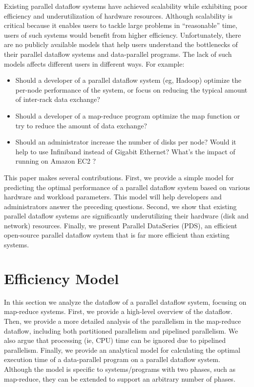 \documentclass{acm_proc_article-sp}
\begin{document}
Existing parallel dataflow systems have achieved scalability while exhibiting poor efficiency and underutilization of hardware resources. Although scalability is critical because it enables users to tackle large problems in ``reasonable'' time, users of such systems would benefit from higher efficiency. Unfortunately, there are no publicly available models that help users understand the bottlenecks of their parallel dataflow systems and data-parallel programs. The lack of such models affects different users in different ways. For example:
\begin{itemize}
  \item Should a developer of a parallel dataflow system (eg, Hadoop) optimize
  the per-node performance of the system, or focus on reducing the typical amount of inter-rack data exchange?
  \item Should a developer of a map-reduce program optimize the map function
  or try to reduce the amount of data exchange?
  \item Should an administrator increase the number of disks per
  node? Would it help to use Infiniband instead of Gigabit
  Ethernet? What's the impact of running on Amazon EC2
  \cite{amazonec2}?
\end{itemize}

This paper makes several contributions. First, we provide a simple model for
predicting the optimal performance of a parallel dataflow system based on
various hardware and workload parameters. This model will help developers and
administrators answer the preceding questions. Second, we show that
existing parallel dataflow systems are significantly underutilizing their
hardware (disk and network) resources. Finally, we present Parallel DataSeries
(PDS), an efficient open-source parallel dataflow system that is far more efficient than existing systems.

\section{Efficiency Model}

In this section we analyze the dataflow of a parallel dataflow system, focusing
on map-reduce systems. First, we provide a high-level overview of the dataflow.
Then, we provide a more detailed analysis of the parallelism in the map-reduce
dataflow, including both partitioned parallelism and pipelined parallelism. We
also argue that processing (ie, CPU) time can be ignored due to pipelined
parallelism. Finally, we provide an analytical model for
calculating the optimal execution time of a data-parallel program on a parallel
dataflow system. Although the model is specific to systems/programs with
two phases, such as map-reduce, they can be extended to support an arbitrary
number of phases.
\end{document}
